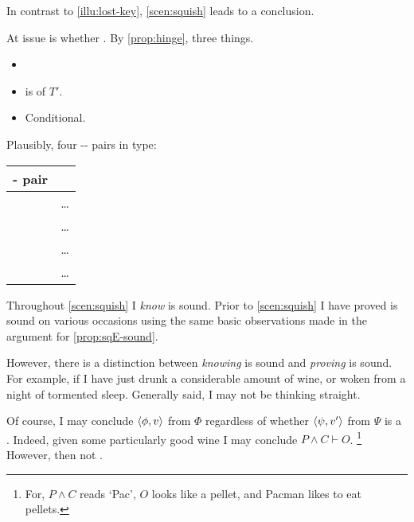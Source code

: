 \begin{note}
  In contrast to \autoref{illu:lost-key}, \autoref{scen:squish} leads to a conclusion.

  At issue is whether \requ{}.
  By \autoref{prop:hinge}, three things.
  \begin{itemize}
  \item
    \tRep{}
  \item
    \sqE{} is \tI{} of \(T'\).
  \item
    Conditional.
  \end{itemize}

  Plausibly, four -- pairs in type:

  \begin{center}
    \begin{tabular}{R{.45\textwidth} L{.45\textwidth}}
      - pair &  \\
      \hline
       & \dots \\
       & \dots \\
       & \dots \\
       & \dots \\
    \end{tabular}
  \end{center}

  Throughout \autoref{scen:squish} I \emph{know} \sqE{} is sound.
  Prior to \autoref{scen:squish} I have proved \sqE{} is sound on various occasions using the same basic observations made in the argument for \autoref{prop:sqE-sound}.

  However, there is a distinction between \emph{knowing} \sqE{} is sound and \emph{proving} \sqE{} is sound.
  For example, if I have just drunk a considerable amount of wine, or woken from a night of tormented sleep.
  Generally said, I may not be thinking straight.

  Of course, I may conclude \(\langle \phi, v \rangle\) from \(\Phi\) regardless of whether \(\langle \psi, v' \rangle\) from \(\Psi\) is a \fc{}.
  Indeed, given some particularly good wine I may conclude \(P \land C \vdash O\).%
  \footnote{
    For, \(P \land C\) reads `Pac', \(O\) looks like a pellet, and Pacman likes to eat pellets.
  }
  However, then not \tCV{}.
\end{note}

